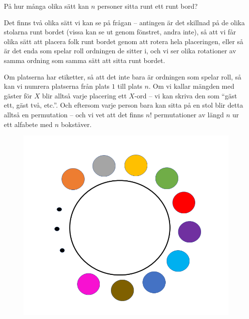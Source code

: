 \documentclass{tufte-handout}
\begin{document}
\begin{example}
	På hur många olika sätt kan $n$ personer sitta runt ett runt bord?

	Det finns två olika sätt vi kan se på frågan -- antingen är det skillnad på de olika stolarna runt bordet (vissa kan se ut genom fönstret, andra inte), så att vi får olika sätt att placera folk runt bordet genom att rotera hela placeringen, eller så är det enda som spelar roll ordningen de sitter i, och vi ser olika rotationer av samma ordning som samma sätt att sitta runt bordet.

	Om platserna har etiketter, så att det inte bara är ordningen som spelar roll, så kan vi numrera platserna från plats $1$ till plats $n$. Om vi kallar mängden med gäster för $X$ blir alltså varje placering ett $X$-ord -- vi kan skriva den som ``gäst ett, gäst två, etc.''. Och eftersom varje person bara kan sitta på en stol blir detta alltså en permutation -- och vi vet att det finns $n!$ permutationer av längd $n$ ur ett alfabete med $n$ bokstäver.

	 \begin{figure}[h]    \includegraphics{graphics/bordmedfarg1.png}
\end{figure}


\end{example}
\end{document}
